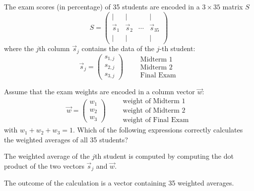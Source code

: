 \documentclass{ximera}
\author{Tae Eun Kim}
\begin{document}
\begin{exercise}
  The exam scores (in percentage) of 35 students are encoded in a
  $3 \times 35$ matrix $S$
  \[
    S =
    \begin{pmatrix}
      |&|&&| \\
      \vec{s}_1 & \vec{s}_2 & \cdots & \vec{s}_{35} \\
      |&|&&|
    \end{pmatrix}
  \]
  where the $j$th column $\vec{s}_j$ contains the data of the $j$-th
  student:
  \[
    \vec{s}_j =
    \begin{pmatrix}
      s_{1,j}\\ s_{2,j} \\ s_{3,j}
    \end{pmatrix}
    \qquad
    \begin{array}{l}
      \text{Midterm 1}\\
      \text{Midterm 2}\\
      \text{Final Exam}
    \end{array}
  \]

  Assume that the exam weights are encoded in a column
  vector $\vec{w}$:
  \[
    \vec{w} =
    \begin{pmatrix}
      w_1\\ w_2\\ w_3
    \end{pmatrix}
    \qquad
    \begin{array}{l}
      \text{weight of Midterm 1}\\
      \text{weight of Midterm 2}\\
      \text{weight of Final Exam}
    \end{array}
  \]
  with $w_1 + w_2 + w_3 = 1$. Which of the following expressions
  correctly calculates the weighted averages of all 35 students?
  \begin{multipleChoice}
    \pdfOnly{\end{multicols}}
  \end{multipleChoice}
  \begin{hint}
    The weighted average of the $j$th student is computed by computing
    the dot product of the two vectors $\vec{s}_j$ and $\vec{w}$.
  \end{hint}
  \begin{prompt}
    The outcome of the calculation is a
     vector
    containing 35 weighted averages.
  \end{prompt}
\end{exercise}
\end{document}
